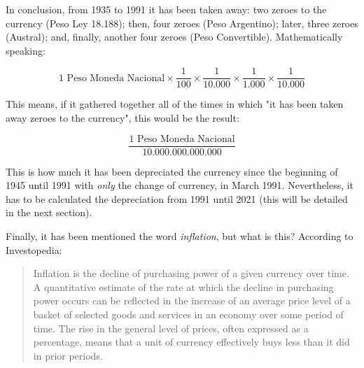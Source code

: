 \documentclass[12pt,a4paper,twoside]{book}
\begin{document}
In conclusion, from 1935 to 1991 it has been taken away: two zeroes to the currency (Peso Ley 18.188); then, four zeroes (Peso Argentino); later, three zeroes (Austral); and, finally, another four zeroes (Peso Convertible). Mathematically speaking:

\[
1 \text{ Peso Moneda Nacional} \times \dfrac{1}{100} \times \dfrac{1}{10.000} \times \dfrac{1}{1.000} \times \dfrac{1}{10.000}
\]

This means, if it gathered together all of the times in which "it has been taken away zeroes to the currency", this would be the result:

\[
\dfrac{1 \text{ Peso Moneda Nacional}}{10.000.000.000.000}
\]

This is how much it has been depreciated the currency since the beginning of 1945 until 1991 with \textit{only} the change of currency, in March 1991. Nevertheless, it has to be calculated the depreciation from 1991 until 2021 (this will be detailed in the next section).

Finally, it has been mentioned the word \textit{inflation}, but what is this? According to Investopedia:

\begin{quote}
Inflation is the decline of purchasing power of a given currency over time. A quantitative estimate of the rate at which the decline in purchasing power occurs can be reflected in the increase of an average price level of a basket of selected goods and services in an economy over some period of time. The rise in the general level of prices, often expressed as a percentage, means that a unit of currency effectively buys less than it did in prior periods. \cite{ipedia:infl}
\end{quote}
\end{document}
